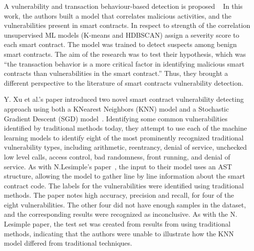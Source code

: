 A vulnerability and transaction behaviour-based detection is proposed ~\cite{contractfuzzer}
 In this work, the authors built a model that correlates malicious activities, and the vulnerabilities present in smart contracts.
 In respect to strength of the correlation unsupervised ML models (K-means and HDBSCAN) assign a severity score to each smart contract.
 The model was trained to detect suspects among benign smart contracts. The aim of the research was to test their hypothesis,
 which was “the transaction behavior is a more critical factor in identifying malicious smart contracts than vulnerabilities in the smart contract.” Thus, they brought a different perspective
 to the literature of smart contracts vulnerability detection.

Y. Xu et al.'s paper introduced two novel smart contract vulnerability detecting approach using both a KNearest Neighbors (KNN) model and a Stochastic Gradient Descent (SGD) model~\cite{slither}.
Identifying some common vulnerabilities identified by traditional methods today, they attempt to use each of the machine learning models to identify eight of the most prominently recognized
traditional vulnerability types, including arithmetic, reentrancy, denial of service, unchecked low level calls, access control, bad randomness, front running, and denial of service.
As with N.Lesimple's paper~\cite{he2019learning}, the input to their model uses an AST structure, allowing the model to gather line by line information about the smart contract code.
The labels for the vulnerabilities were identified using traditional methods.
The paper notes high accuracy, precision and recall, for four of the eight vulnerabilities.
The other four did not have enough samples in the dataset, and the corresponding results were recognized as inconclusive.
As with the N. Lesimple paper, the test set was created from results from using traditional methods,
indicating that the authors were unable to illustrate how the KNN model differed from traditional techniques.

